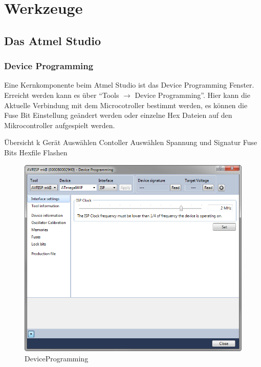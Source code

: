 
\section{Werkzeuge}

\subsection{Das Atmel Studio}

\subsubsection{Device Programming}

Eine Kernkomponente beim Atmel Studio ist das Device Programming Fenster.
Erreicht werden kann es über "`Tools $\to$  Device Programming"'.
Hier kann die Aktuelle Verbindung mit dem Microcotroller bestimmt werden, es
können die Fuse Bit Einstellung geändert werden oder einzelne Hex
Dateien auf den Mikrocontroller aufgespielt werden.



Übersicht k Gerät Auswählen
Contoller Auswählen
Spannung und Signatur
Fuse Bits
Hexfile Flashen

\begin{figure}[h]
\centering
\includegraphics[width=13cm]{content/pictures/Anleitung/neuerProzessor/AnleitungNeuerProzessor1.png}
\caption{DeviceProgramming}
\label{fig:B3}
\end{figure}

